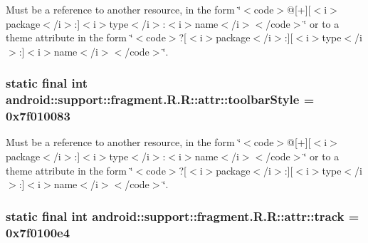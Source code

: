 Must be a reference to another resource, in the form \char`\"{}$<$code$>$@\mbox{[}+\mbox{]}\mbox{[}$<$i$>$package$<$/i$>$:\mbox{]}$<$i$>$type$<$/i$>$:$<$i$>$name$<$/i$>$$<$/code$>$\char`\"{} or to a theme attribute in the form \char`\"{}$<$code$>$?\mbox{[}$<$i$>$package$<$/i$>$:\mbox{]}\mbox{[}$<$i$>$type$<$/i$>$:\mbox{]}$<$i$>$name$<$/i$>$$<$/code$>$\char`\"{}. \hypertarget{classandroid_1_1support_1_1fragment_1_1_r_1_1attr_b158db203a56b4296c49b4a97881977f}{
\subsubsection[{toolbarStyle}]{\setlength{\rightskip}{0pt plus 5cm}static final int android::support::fragment.R.R::attr::toolbarStyle = 0x7f010083}}
\label{classandroid_1_1support_1_1fragment_1_1_r_1_1attr_b158db203a56b4296c49b4a97881977f}


Must be a reference to another resource, in the form \char`\"{}$<$code$>$@\mbox{[}+\mbox{]}\mbox{[}$<$i$>$package$<$/i$>$:\mbox{]}$<$i$>$type$<$/i$>$:$<$i$>$name$<$/i$>$$<$/code$>$\char`\"{} or to a theme attribute in the form \char`\"{}$<$code$>$?\mbox{[}$<$i$>$package$<$/i$>$:\mbox{]}\mbox{[}$<$i$>$type$<$/i$>$:\mbox{]}$<$i$>$name$<$/i$>$$<$/code$>$\char`\"{}. \hypertarget{classandroid_1_1support_1_1fragment_1_1_r_1_1attr_eff03d5bd60e16875269ae40b6c25961}{
\subsubsection[{track}]{\setlength{\rightskip}{0pt plus 5cm}static final int android::support::fragment.R.R::attr::track = 0x7f0100e4}}
\label{classandroid_1_1support_1_1fragment_1_1_r_1_1attr_eff03d5bd60e16875269ae40b6c25961}


